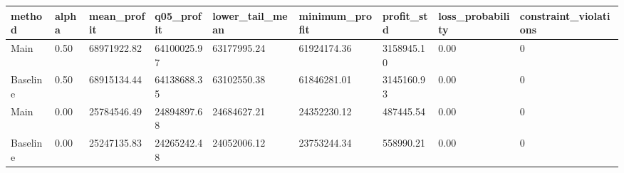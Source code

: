 \begin{tabular}{lllllllll}
\toprule
method & alpha & mean\_profit & q05\_profit & lower\_tail\_mean & minimum\_profit & profit\_std & loss\_probability & constraint\_violations \\
\midrule
Main & 0.50 & 68971922.82 & 64100025.97 & 63177995.24 & 61924174.36 & 3158945.10 & 0.00 & 0 \\
Baseline & 0.50 & 68915134.44 & 64138688.35 & 63102550.38 & 61846281.01 & 3145160.93 & 0.00 & 0 \\
Main & 0.00 & 25784546.49 & 24894897.68 & 24684627.21 & 24352230.12 & 487445.54 & 0.00 & 0 \\
Baseline & 0.00 & 25247135.83 & 24265242.48 & 24052006.12 & 23753244.34 & 558990.21 & 0.00 & 0 \\
\bottomrule
\end{tabular}
